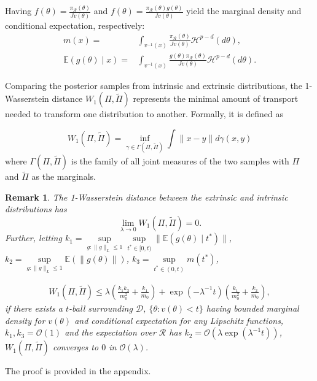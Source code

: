 \documentclass[10pt]{article}
\newtheorem{remark}{Remark}
\newcommand{\mc}[1]{\mathcal{#1}}
\DeclareMathOperator{\1}{\mathbbm{1}}
\begin{document}
Having $f(\theta)=\frac{\pi_{\mc R}(\theta)}{J v(\theta)}$ and $f(\theta)=\frac{\pi_{\mc R}(\theta)g(\theta)}{J v(\theta)}$ yield the marginal density and conditional expectation, respectively:
\begin{equation}
	\begin{aligned}
m(x)= & \int_{v^{-1}(x)} \frac{ \pi_{\mc R}(\theta) }{ J v(\theta) } \mathcal{H}^{p-d}(d \theta),\\
\mathbb{E}(g(\theta) \mid x)= & \int_{v^{-1}(x)} \frac{ g(\theta) \pi_{\mc R}(\theta)}{ J v(\theta) } \mathcal{H}^{p-d}(d \theta).
		\end{aligned}
\end{equation}

Comparing the posterior samples from intrinsic and extrinsic distributions, the 1-Wasserstein distance $W_1(\Pi,\tilde\Pi)$ represents the minimal amount of transport needed to transform one distribution to another. Formally, it is defined as

$$W_1(\Pi,\tilde\Pi)=\underset{\gamma\in \Gamma(\Pi,\tilde\Pi)}{\inf}\int \|x-y\| d\gamma(x,y)$$ 
where $\Gamma(\Pi,\tilde\Pi)$ is the family of all joint measures of the two samples with $\Pi$ and $\tilde\Pi$ as the marginals.

\begin{remark}
The 1-Wasserstein distance between the extrinsic and intrinsic distributions has
$$ \underset{\lambda \rightarrow 0}\lim W_1(\Pi,\tilde\Pi)=0.$$
Further,  letting $k_1=\underset{g:\|g\|_L\le 1}\sup\underset{t^*\in [0,t)}\sup \|\mathbb{E}(g(\theta) \mid t^*)\|$, $k_2=\underset{g:\|g\|_L\le 1} \sup \mathbb{E}(\| g(\theta )\|)$, $k_3= \underset{t^*\in (0,t)}\sup  m(t^{*})$,

\begin{equation}
\begin{aligned}
W_1(\Pi,\tilde\Pi) \le \lambda (\frac{k_1 k_3}{m_0^2} + \frac{k_1}{m_0}) + \exp(- \lambda^{-1} t )(\frac{k_1}{m_0^2} + \frac{k_2}{m_0}),
\end{aligned}
\end{equation}
if there exists a $t$-ball surrounding $\mc D$, $\{\theta: v(\theta)<t\}$ having bounded marginal density for $v(\theta)$ and conditional expectation for any Lipschitz functions, $k_1,k_3= \mc O(1)$ and the expectation over $\mc R$ has $k_2 = \mc O(\lambda \exp(\lambda^{-1} t))$, $W_1(\Pi,\tilde\Pi)$ converges to $0$ in $\mc O(\lambda)$.


\end{remark}

The proof is provided in the appendix.
\end{document}
